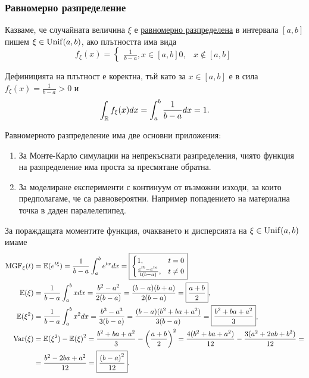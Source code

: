 \documentclass[numbers=endperiod, DIV=15, bibliography=totocnumbered]{scrartcl}
\begin{document}
\subsubsection{Равномерно разпределение}\label{dist:unif}

\begin{definition}
  Казваме, че случайната величина $\xi$ е \uline{равномерно разпределена} в интервала $[a, b]$ пишем $\xi \in \operatorname{Unif}(a, b)$, ако плътността има вида
  \begin{displaymath}
    f_\xi(x)
    =
    \begin{cases}
      \frac 1 {b-a}, x \in [a, b]
      0, & x \not\in [a, b]
    \end{cases}
  \end{displaymath}

  Дефиницията на плътност е коректна, тъй като за $x \in [a, b]$ е в сила $f_\xi(x) = \frac 1 {b-a} > 0$ и
  \begin{displaymath}
    \int_{\mathbb{R}} f_\xi(x) dx
    =
    \int_a^b \frac 1 {b-a} dx
    =
    1.
  \end{displaymath}
\end{definition}

Равномерното разпределение има две основни приложения:
\begin{enumerate}
  \item За Монте-Карло симулации на непрекъснати разпределения, чиято функция на разпределение има проста за пресмятане обратна.
  \item За моделиране експерименти с континуум от възможни изходи, за които предполагаме, че са равновероятни. Например попадението на материална точка в даден паралелепипед.
\end{enumerate}

За пораждащата моментите функция, очакването и дисперсията на $\xi \in \operatorname{Unif}(a, b)$ имаме
\begingroup
\allowdisplaybreaks
\begin{align*}
  \operatorname{MGF}_\xi(t)
  &=
  \mathbb{E}(e^{t\xi})
  =
  \frac 1 {b-a} \int_a^b e^{tx} dx
  =
  \boxed{\begin{cases}
    1, &t = 0 \\
    \frac {e^{tb} - e^{ta}} {t(b-a)}, &t \neq 0
  \end{cases}}
  \\
  \mathbb{E}(\xi)
  &=
  \frac 1 {b-a} \int_a^b x dx
  =
  \frac {b^2 - a^2} {2(b-a)}
  =
  \frac {(b-a)(b+a)} {2(b-a)}
  =
  \boxed{\frac {a + b} 2},
  \\
  \mathbb{E}(\xi^2)
  &=
  \frac 1 {b-a} \int_a^b x^2 dx
  =
  \frac {b^3 - a^3} {3(b-a)}
  =
  \frac {(b-a)(b^2+ba+a^2)} {3(b-a)}
  =
  \boxed{\frac {b^2+ba+a^2} 3},
  \\
  \operatorname{Var}(\xi)
  &=
  \mathbb{E}(\xi^2) - {\mathbb{E}(\xi)}^2
  =
  \frac {b^2+ba+a^2} 3 - {\left(\frac {a+b} 2 \right)}^2
  =
  \frac {4(b^2+ba+a^2)} {12} - \frac {3 (a^2+2ab+b^2)} {12}
  = \\ &=
  \frac {b^2-2ba+a^2} {12}
  =
  \boxed{\frac {{(b-a)}^2} {12}}.
\end{align*}
\endgroup
\end{document}
